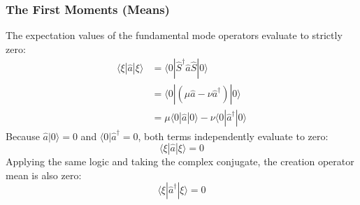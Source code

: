 {\subsubsection{The First Moments (Means)}
The expectation values of the fundamental mode operators evaluate to strictly zero:
\begin{align*}
\langle \xi | \hat{a} | \xi \rangle &= \langle 0 | \hat{S}^\dagger \hat{a} \hat{S} | 0 \rangle \\
&= \langle 0 | (\mu\hat{a} - \nu\hat{a}^\dagger) | 0 \rangle \\
&= \mu \langle 0 | \hat{a} | 0 \rangle - \nu \langle 0 | \hat{a}^\dagger | 0 \rangle
\end{align*}
Because $\hat{a}|0\rangle = 0$ and $\langle 0|\hat{a}^\dagger = 0$, both terms independently evaluate to zero:
\begin{equation*}
\langle \xi | \hat{a} | \xi \rangle = 0
\end{equation*}
Applying the same logic and taking the complex conjugate, the creation operator mean is also zero:
\begin{equation*}
\langle \xi | \hat{a}^\dagger | \xi \rangle = 0
\end{equation*}

}
